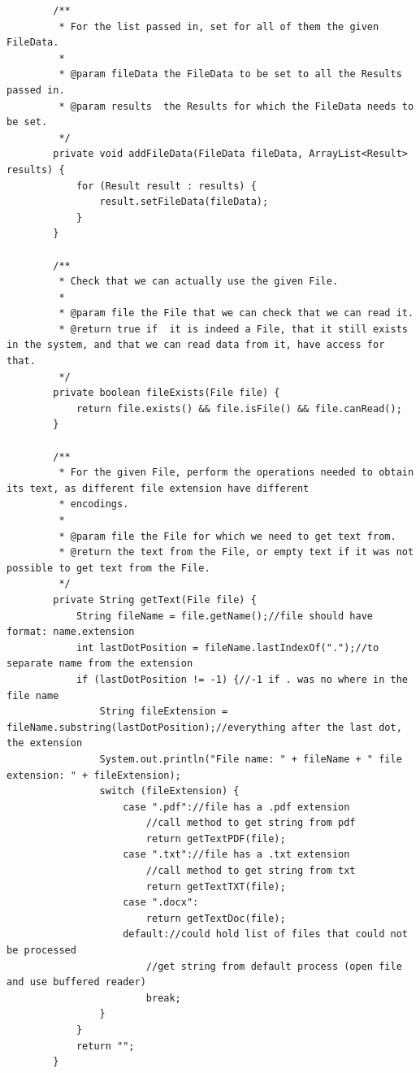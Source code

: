 \begin{lstlisting}
        /**
         * For the list passed in, set for all of them the given FileData.
         *
         * @param fileData the FileData to be set to all the Results passed in.
         * @param results  the Results for which the FileData needs to be set.
         */
        private void addFileData(FileData fileData, ArrayList<Result> results) {
            for (Result result : results) {
                result.setFileData(fileData);
            }
        }

        /**
         * Check that we can actually use the given File.
         *
         * @param file the File that we can check that we can read it.
         * @return true if  it is indeed a File, that it still exists in the system, and that we can read data from it, have access for that.
         */
        private boolean fileExists(File file) {
            return file.exists() && file.isFile() && file.canRead();
        }

        /**
         * For the given File, perform the operations needed to obtain its text, as different file extension have different
         * encodings.
         *
         * @param file the File for which we need to get text from.
         * @return the text from the File, or empty text if it was not possible to get text from the File.
         */
        private String getText(File file) {
            String fileName = file.getName();//file should have format: name.extension
            int lastDotPosition = fileName.lastIndexOf(".");//to separate name from the extension
            if (lastDotPosition != -1) {//-1 if . was no where in the file name
                String fileExtension = fileName.substring(lastDotPosition);//everything after the last dot, the extension
                System.out.println("File name: " + fileName + " file extension: " + fileExtension);
                switch (fileExtension) {
                    case ".pdf"://file has a .pdf extension
                        //call method to get string from pdf
                        return getTextPDF(file);
                    case ".txt"://file has a .txt extension
                        //call method to get string from txt
                        return getTextTXT(file);
                    case ".docx":
                        return getTextDoc(file);
                    default://could hold list of files that could not be processed
                        //get string from default process (open file and use buffered reader)
                        break;
                }
            }
            return "";
        }



\end{lstlisting}
